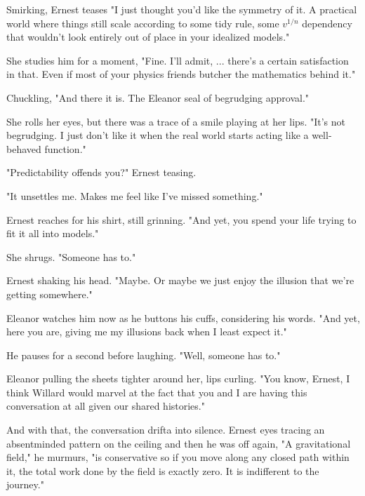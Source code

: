 \smallskip

Smirking, Ernest teases "I just thought you'd like the symmetry of it. A practical world where things still scale according to some tidy rule, some $v^{1/n}$ dependency that wouldn’t look entirely out of place in your idealized models."

\smallskip

She studies him for a moment, "Fine. I’ll admit, ... there’s a certain satisfaction in that. Even if most of your physics friends butcher the mathematics behind it."

\smallskip

Chuckling, "And there it is. The Eleanor seal of begrudging approval."

\smallskip

She rolls her eyes, but there was a trace of a smile playing at her lips. "It’s not begrudging. I just don’t like it when the real world starts acting like a well-behaved function."

\smallskip

"Predictability offends you?" Ernest teasing.

\smallskip

"It unsettles me. Makes me feel like I’ve missed something."

\smallskip

Ernest reaches for his shirt, still grinning. "And yet, you spend your life trying to fit it all into models."

\smallskip

She shrugs. "Someone has to."

\smallskip

Ernest shaking his head. "Maybe. Or maybe we just enjoy the illusion that we’re getting somewhere."

\smallskip

Eleanor watches him now as he buttons his cuffs, considering his words. "And yet, here you are, giving me my illusions back when I least expect it."

\smallskip

He pauses for a second before laughing. "Well, someone has to."

\smallskip
Eleanor pulling the sheets tighter around her, lips curling. "You know, Ernest, I think Willard would marvel at the fact that you and I are having this conversation at all given our shared histories."

\smallskip

And with that, the conversation drifta into silence. Ernest eyes tracing an absentminded pattern on the ceiling and then he was off again, "A gravitational field," he murmurs, "is conservative so if you move along any closed path within it, the total work done by the field is exactly zero. It is indifferent to the journey."

